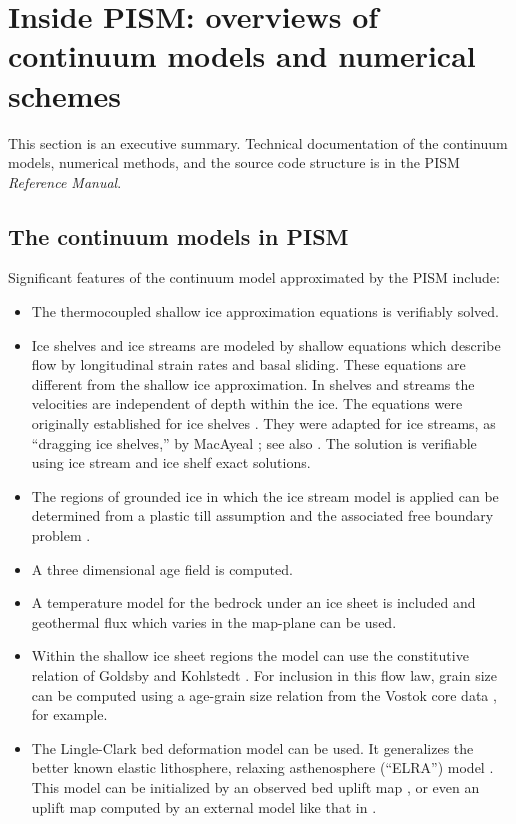 \documentclass[11pt,final]{amsart}
\begin{document}
\clearpage\newpage
\section{Inside PISM: overviews of continuum models and numerical schemes}\label{sect:over}

This section is an executive summary.  Technical documentation of the continuum models, numerical methods, and the source code structure is in the PISM \emph{Reference Manual}.

\subsection{The continuum models in PISM}  Significant features of the continuum model approximated by the PISM include:\begin{itemize}
\item The thermocoupled shallow ice approximation equations \cite{Fowler} is verifiably \cite{BLKCB,BBL} solved.
\item Ice shelves and ice streams are modeled by shallow equations which describe flow by longitudinal strain rates and basal sliding.  These equations are different from the shallow ice approximation.  In shelves and streams the velocities are independent of depth within the ice.  The equations were originally established for ice shelves \cite{Morland,MorlandZainuddin,MacAyealetal,WeisGreveHutter}.  They were adapted for ice streams, as ``dragging ice shelves,'' by MacAyeal \cite{MacAyeal}; see also \cite{HulbeMacAyeal,SchoofStream}.  The solution is verifiable using ice stream and ice shelf exact solutions.
\item The regions of grounded ice in which the ice stream model is applied can be determined from a plastic till assumption and the associated free boundary problem \cite{SchoofStream}.
\item A three dimensional age field is computed.
\item A temperature model for the bedrock under an ice sheet is included and geothermal flux which varies in the map-plane can be used.
\item Within the shallow ice sheet regions the model can use the constitutive relation of Goldsby and Kohlstedt \cite{GoldsbyKohlstedt,Peltieretal}.  For inclusion in this flow law, grain size can be computed using a age-grain size relation from the Vostok core data \cite{VostokCore}, for example.
\item The Lingle-Clark \cite{BLKfastearth,LingleClark} bed deformation model can be used.  It generalizes the better known elastic lithosphere, relaxing asthenosphere (``ELRA'') model \cite{Greve2001}.  This model can be initialized by an observed bed uplift map \cite{BLKfastearth}, or even an uplift map computed by an external model like that in \cite{IvinsJames2005}.\end{itemize}
\end{document}
